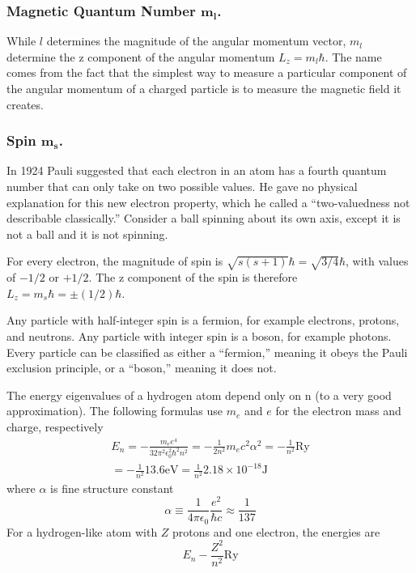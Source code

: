 \documentclass[../main.tex]{subfiles}
\begin{document}
\subsubsection*{Magnetic Quantum Number $\boldsymbol{m_l}$.}  While $l$ determines the magnitude of the angular momentum vector, $m_l$ determine the z component of the angular momentum $L_z = m_l \hbar$. The name comes from the fact that the simplest way to measure a particular component of the angular momentum of a charged particle is to measure the magnetic field it creates.

\subsubsection*{Spin $\boldsymbol{m_s}$.} In 1924 Pauli suggested that each electron in an atom has a fourth quantum number that can only take on two possible values. He gave no physical explanation for this new electron property, which he called a “two-valuedness not describable classically.” Consider a ball spinning about its own axis, except it is not a ball and it is not spinning.

For every electron, the magnitude of spin is $\sqrt{s(s + 1)}\hbar=\sqrt{3/4}\hbar$, with values of $-1/2$ or $+1/2$. The z component of the spin is therefore $L_z= m_s\hbar=\pm(1/2)\hbar$.

Any particle with half-integer spin is a fermion, for example electrons, protons, and neutrons. Any particle with integer spin is a boson, for example photons. Every particle can be classified as either a “fermion,” meaning it obeys the Pauli exclusion principle, or a “boson,” meaning it does not. 

The energy eigenvalues of a hydrogen atom depend only on n (to a very good approximation). The  following formulas use $m_e$ and $e$ for the electron mass and charge, respectively
\begin{multline*}
    E_n=-\frac{m_ee^4}{32\pi^2\epsilon_0^2
    \hbar^2n^2}=-\frac{1}{2n^2}m_ec^2\alpha^2 = -\frac{1}{n^2}\text{Ry}\\
    = -\frac{1}{n^2}13.6 \text{eV}=\frac{1}{n^2}2.18\times 10^{-18}\text{J}
\end{multline*}
where $\alpha$ is fine structure constant
\begin{equation*}
    \alpha \equiv \frac{1}{4\pi\epsilon_0}\frac{e^2}{\hbar c}\approx \frac{1}{137}
\end{equation*}
For a hydrogen-like atom with $Z$ protons and one electron, the energies are
\begin{equation*}
    E_n-\frac{Z^2}{n^2}\text{Ry}
\end{equation*}
\end{document}
